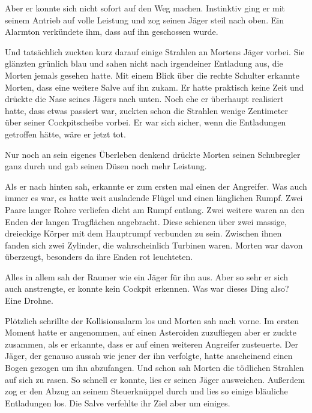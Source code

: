 \par

Aber er konnte sich nicht sofort auf den Weg machen. Instinktiv ging er mit seinem Antrieb auf volle Leistung und zog seinen Jäger steil nach oben. Ein Alarmton verkündete ihm, dass auf ihn geschossen wurde.

\par

Und tatsächlich zuckten kurz darauf einige Strahlen an Mortens Jäger vorbei. Sie glänzten grünlich blau und sahen nicht nach irgendeiner Entladung aus, die Morten jemals gesehen hatte. Mit einem Blick über die rechte Schulter erkannte Morten, dass eine weitere Salve auf ihn zukam. Er hatte praktisch keine Zeit und drückte die Nase seines Jägers nach unten. Noch ehe er überhaupt realisiert hatte, dass etwas passiert war, zuckten schon die Strahlen wenige Zentimeter über seiner Cockpitscheibe vorbei. Er war sich sicher, wenn die Entladungen getroffen hätte, wäre er jetzt tot.

\par

Nur noch an sein eigenes Überleben denkend drückte Morten seinen Schubregler ganz durch und gab seinen Düsen noch mehr Leistung.

\par

Als er nach hinten sah, erkannte er zum ersten mal einen der Angreifer. Was auch immer es war, es hatte weit ausladende Flügel und einen länglichen Rumpf. Zwei Paare langer Rohre verliefen dicht am Rumpf entlang. Zwei weitere waren an den Enden der langen Tragflächen angebracht. Diese schienen über zwei massige, dreieckige Körper mit dem Hauptrumpf verbunden zu sein. Zwischen ihnen fanden sich zwei Zylinder, die wahrscheinlich Turbinen waren. Morten war davon überzeugt, besonders da ihre Enden rot leuchteten.

\par

Alles in allem sah der Raumer wie ein Jäger für ihn aus. Aber so sehr er sich auch anstrengte, er konnte kein Cockpit erkennen. Was war dieses Ding also? Eine Drohne.

\par

Plötzlich schrillte der Kollisionsalarm los und Morten sah nach vorne. Im ersten Moment hatte er angenommen, auf einen Asteroiden zuzufliegen aber er zuckte zusammen, als er erkannte, dass er auf einen weiteren Angreifer zusteuerte. Der Jäger, der genauso aussah wie jener der ihn verfolgte, hatte anscheinend einen Bogen gezogen um ihn abzufangen. Und schon sah Morten die tödlichen Strahlen auf sich zu rasen. So schnell er konnte, lies er seinen Jäger ausweichen. Außerdem zog er den Abzug an seinem Steuerknüppel durch und lies so einige bläuliche Entladungen los. Die Salve verfehlte ihr Ziel aber um einiges.

